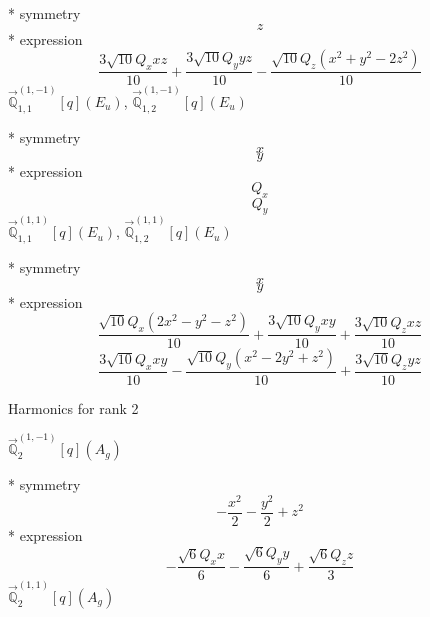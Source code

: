 \documentclass[fleqn,8pt]{jsarticle}
\begin{document}
\noindent\quad ** symmetry
\begin{dmath*}
z
\end{dmath*}
\noindent\quad ** expression
\begin{dmath*}
\frac{3 \sqrt{10} Q_{x} x z}{10} + \frac{3 \sqrt{10} Q_{y} y z}{10} - \frac{\sqrt{10} Q_{z} \left(x^{2} + y^{2} - 2 z^{2}\right)}{10}
\end{dmath*}
\noindent\quad $\vec{\mathbb{Q}}_{1,1}^{(1,-1)}[q](E_{u})$, $\vec{\mathbb{Q}}_{1,2}^{(1,-1)}[q](E_{u})$

\noindent\quad ** symmetry
\begin{dmath*}
x
\end{dmath*}
\begin{dmath*}
y
\end{dmath*}
\noindent\quad ** expression
\begin{dmath*}
Q_{x}
\end{dmath*}
\begin{dmath*}
Q_{y}
\end{dmath*}
\noindent\quad $\vec{\mathbb{Q}}_{1,1}^{(1,1)}[q](E_{u})$, $\vec{\mathbb{Q}}_{1,2}^{(1,1)}[q](E_{u})$

\noindent\quad ** symmetry
\begin{dmath*}
x
\end{dmath*}
\begin{dmath*}
y
\end{dmath*}
\noindent\quad ** expression
\begin{dmath*}
\frac{\sqrt{10} Q_{x} \left(2 x^{2} - y^{2} - z^{2}\right)}{10} + \frac{3 \sqrt{10} Q_{y} x y}{10} + \frac{3 \sqrt{10} Q_{z} x z}{10}
\end{dmath*}
\begin{dmath*}
\frac{3 \sqrt{10} Q_{x} x y}{10} - \frac{\sqrt{10} Q_{y} \left(x^{2} - 2 y^{2} + z^{2}\right)}{10} + \frac{3 \sqrt{10} Q_{z} y z}{10}
\end{dmath*}

\noindent * Harmonics for rank 2

\noindent\quad $\vec{\mathbb{Q}}_{2}^{(1,-1)}[q](A_{g})$

\noindent\quad ** symmetry
\begin{dmath*}
- \frac{x^{2}}{2} - \frac{y^{2}}{2} + z^{2}
\end{dmath*}
\noindent\quad ** expression
\begin{dmath*}
- \frac{\sqrt{6} Q_{x} x}{6} - \frac{\sqrt{6} Q_{y} y}{6} + \frac{\sqrt{6} Q_{z} z}{3}
\end{dmath*}
\noindent\quad $\vec{\mathbb{Q}}_{2}^{(1,1)}[q](A_{g})$
\end{document}
